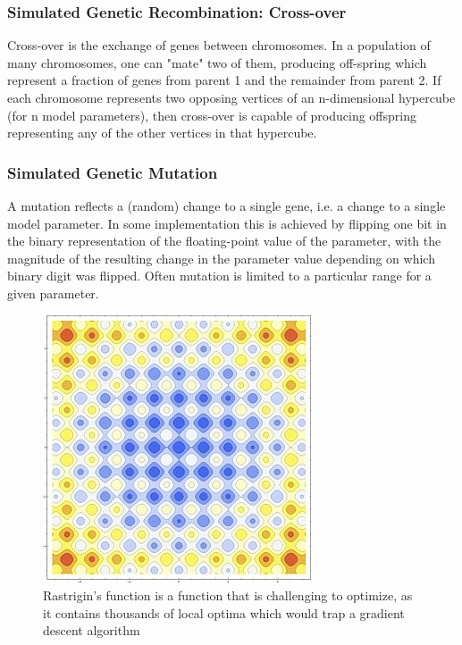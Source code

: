 \subsubsection{Simulated Genetic Recombination: Cross-over}
Cross-over is the exchange of genes between chromosomes.  In a population of many chromosomes, one can "mate" two of them, producing off-spring which represent a fraction of genes from parent 1 and the remainder from parent 2.  If each chromosome represents two opposing vertices of an n-dimensional hypercube (for n model parameters), then cross-over is capable of producing offspring representing any of the other vertices in that hypercube.
\subsubsection{Simulated Genetic Mutation}
A mutation reflects a (random) change to a single gene, i.e. a change to a single model parameter.  In some implementation this is achieved by flipping one bit in the binary representation of the floating-point value of the parameter, with the magnitude of the resulting change in the parameter value depending on which binary digit was flipped.  Often mutation is limited to a particular range for a given parameter.
\begin{figure}
\begin{center}

\includegraphics[scale=0.5]{figures/rastagrind}
\caption{Rastrigin's function is a function that is challenging to optimize, as it contains thousands of local optima which would trap a gradient descent algorithm \cite{rastrigin1974systems}}
\label{fig:rastrigin}

\end{center}

\end{figure}

